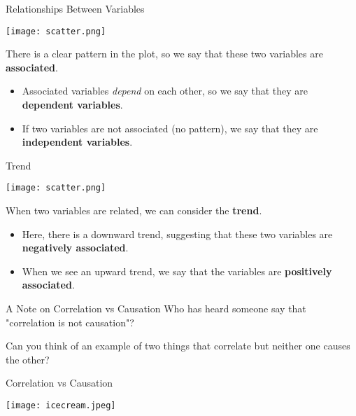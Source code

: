 \begin{frame}{Relationships Between Variables}
    \begin{center}
        \texttt{[image: scatter.png]}
    \end{center}
    
    There is a clear pattern in the plot, so we say that these two variables are \textbf{associated}.
    \begin{itemize}
        \item Associated variables \textit{depend} on each other, so we say that they are \textbf{dependent variables}. 
        \item If two variables are not associated (no pattern), we say that they are \textbf{independent variables}.
    \end{itemize}
\end{frame}

\begin{frame}{Trend}
    \begin{center}
        \texttt{[image: scatter.png]}
    \end{center}
    
    When two variables are related, we can consider the \textbf{trend}. 
    \begin{itemize}
        \item Here, there is a downward trend, suggesting that these two variables are \textbf{negatively associated}. 
        \item When we see an upward trend, we say that the variables are \textbf{positively associated}.
    \end{itemize}
\end{frame}

\begin{frame}{A Note on Correlation vs Causation}
    Who has heard someone say that "correlation is not causation"? 
    
    \vspace{1cm}
    Can you think of an example of two things that correlate but neither one causes the other?
\end{frame}

\begin{frame}{Correlation vs Causation}
    \begin{center}
        \texttt{[image: icecream.jpeg]}
    \end{center}
\end{frame}

